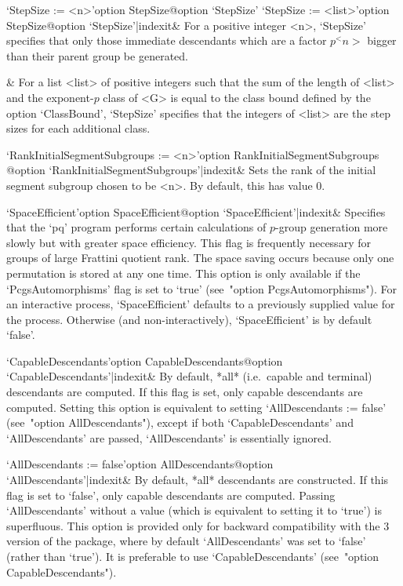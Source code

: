 \>`StepSize := <n>'{option StepSize}@{option `StepSize'}
\>`StepSize := <list>'{option StepSize}@{option `StepSize'|indexit}&
For  a  positive  integer  <n>,  `StepSize'  specifies  that  only  those
immediate descendants which are a factor $p^<n>$ bigger than their parent
group be generated.

&
For a list <list> of positive integers such that the sum of the length of
<list> and the exponent-$p$ class of <G> is  equal  to  the  class  bound
defined  by  the  option  `ClassBound',  `StepSize'  specifies  that  the
integers of <list> are the step sizes for each additional class.

\>`RankInitialSegmentSubgroups := <n>'{option RankInitialSegmentSubgroups}%
@{option `RankInitialSegmentSubgroups'|indexit}&
Sets the rank of the initial  segment  subgroup  chosen  to  be  <n>.  By
default, this has value 0.

\>`SpaceEfficient'{option SpaceEfficient}@{option `SpaceEfficient'|indexit}&
Specifies that the `pq' program performs certain calculations of $p$-group
generation more slowly  but with greater space efficiency.   This flag is
frequently  necessary for groups  of large  Frattini quotient  rank.  The
space saving  occurs because  only one permutation  is stored at  any one
time. This  option is only  available if the `PcgsAutomorphisms'  flag is
set  to  `true'  (see~"option  PcgsAutomorphisms").  For  an  interactive
process, `SpaceEfficient' defaults to a previously supplied value for the
process.   Otherwise  (and  non-interactively),  `SpaceEfficient'  is  by
default `false'.


\>`CapableDescendants'{option CapableDescendants}@{option `CapableDescendants'|indexit}&
By default, *all* (i.e.~capable and terminal) descendants  are  computed.
If this flag is set, only capable descendants are computed. Setting  this
option is equivalent to setting `AllDescendants  :=  false'  (see~"option
AllDescendants"),    except    if    both    `CapableDescendants'     and
`AllDescendants' are passed, `AllDescendants' is essentially ignored.

\>`AllDescendants := false'{option AllDescendants}@{option `AllDescendants'|indexit}&
By default, *all* descendants are constructed. If this  flag  is  set  to
`false', only capable descendants are computed. Passing  `AllDescendants'
without a value  (which  is  equivalent  to  setting  it  to  `true')  is
superfluous. This option is provided only for backward compatibility with
the  {\GAP}  3  version  of  the  {\ANUPQ}  package,  where  by   default
`AllDescendants'  was  set  to  `false'  (rather  than  `true').  It   is
preferable to use `CapableDescendants' (see~"option CapableDescendants").


